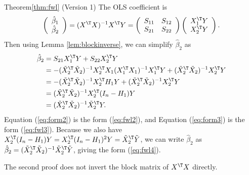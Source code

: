 \begin{myproof}{Theorem}{\ref{thm:fwl}} (Version 1) 
The OLS coefficient is
\[
\left(\begin{array}{c}
\hat{\beta}_{1}\\
\hat{\beta}_{2}
\end{array}\right)=(X^{\T}X)^{-1}X^{\T}Y=\left(\begin{array}{cc}
 S_{11}  &  S_{12} \\
 S_{21}  &  S_{22} 
\end{array}\right)\left(\begin{array}{c}
X_{1}^{\T}Y\\
X_{2}^{\T}Y
\end{array}\right).
\]
Then using Lemma \ref{lem:blockinverse}, we can simplify $\hat{\beta}_{2}$
as 
\begin{align}
\hat{\beta}_{2} & = S_{21} X_{1}^{\T}Y+ S_{22} X_{2}^{\T}Y\nonumber \\
 & =-(\tilde{X}_{2}^{\T}\tilde{X}_{2})^{-1}X_{2}^{\T}X_{1}(X_{1}^{\T}X_{1})^{-1}X_{1}^{\T}Y+(\tilde{X}_{2}^{\T}\tilde{X}_{2})^{-1}X_{2}^{\T}Y\nonumber \\
 & =-(\tilde{X}_{2}^{\T}\tilde{X}_{2})^{-1}X_{2}^{\T}H_{1}Y+(\tilde{X}_{2}^{\T}\tilde{X}_{2})^{-1}X_{2}^{\T}Y\nonumber \\
 & =(\tilde{X}_{2}^{\T}\tilde{X}_{2})^{-1}X_{2}^{\T}(I_{n}-H_{1})Y\label{eq:form2}\\
 & =(\tilde{X}_{2}^{\T}\tilde{X}_{2})^{-1}\tilde{X}_{2}^{\T}Y.\label{eq:form3}
\end{align}
Equation (\ref{eq:form2}) is the form (\ref{eq:fwl2}), and Equation
(\ref{eq:form3}) is the form (\ref{eq:fwl3}). Because we also have
$X_{2}^{\T}(I_{n}-H_{1})Y=X_{2}^{\T}(I_{n}-H_{1})^{2}Y=\tilde{X}_{2}^{\T}\tilde{Y}$,
we can write $\hat{\beta}_{2}$ as $\hat{\beta}_{2}=(\tilde{X}_{2}^{\T}\tilde{X}_{2})^{-1}\tilde{X}_{2}^{\T}\tilde{Y}$,
giving the form (\ref{eq:fwl4}). 
\end{myproof}




The second proof does not invert the block matrix of $X^{\T} X$ directly. 


